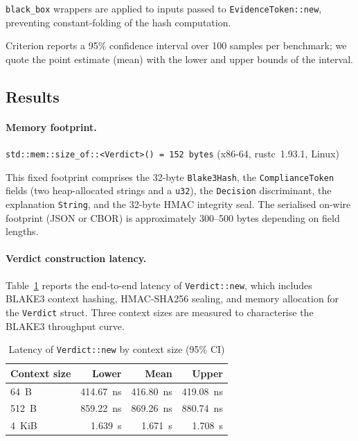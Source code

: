 \texttt{black\_box} wrappers are applied to inputs passed to
\texttt{EvidenceToken::new}, preventing constant-folding of the hash
computation.

Criterion reports a 95\% confidence interval over 100 samples per
benchmark; we quote the point estimate (mean) with the lower and
upper bounds of the interval.

\subsection{Results}
\label{sec:results}

\paragraph{Memory footprint.}
\begin{center}
\texttt{std::mem::size\_of::\textless{}Verdict\textgreater{}() = 152 bytes} (x86-64, rustc~1.93.1, Linux)
\end{center}
This fixed footprint comprises the 32-byte \texttt{Blake3Hash}, the
\texttt{ComplianceToken} fields (two heap-allocated strings and a
\texttt{u32}), the \texttt{Decision} discriminant, the explanation
\texttt{String}, and the 32-byte HMAC integrity seal.  The serialised
on-wire footprint (JSON or CBOR) is approximately 300--500 bytes
depending on field lengths.

\paragraph{Verdict construction latency.}
Table~\ref{tab:new} reports the end-to-end latency of
\texttt{Verdict::new}, which includes BLAKE3 context hashing,
HMAC-SHA256 sealing, and memory allocation for the \texttt{Verdict}
struct.  Three context sizes are measured to characterise the
BLAKE3 throughput curve.

\begin{table}[t]
\caption{Latency of \texttt{Verdict::new} by context size (95\% CI)}
\label{tab:new}
\begin{tabular}{lrrr}
\hline
\textbf{Context size} & \textbf{Lower} & \textbf{Mean} & \textbf{Upper} \\
\hline
64~B   & 414.67~ns & 416.80~ns & 419.08~ns \\
512~B  & 859.22~ns & 869.26~ns & 880.74~ns \\
4~KiB  & 1.639~\textmu{}s & 1.671~\textmu{}s & 1.708~\textmu{}s \\
\hline
\end{tabular}
\end{table}

